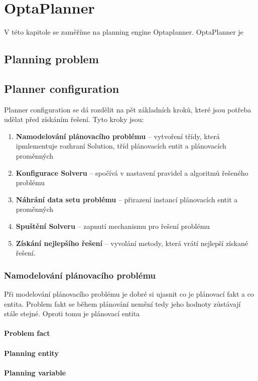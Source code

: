 \section{OptaPlanner}

V této kapitole se zaměříme na planning engine Optaplanner. OptaPlanner je 


\subsection{Planning problem}

\subsection{Planner configuration}
Planner configuration se dá rozdělit na pět základních kroků, které jsou potřeba udělat před získáním řešení. Tyto kroky jsou:
\begin{enumerate}
\item \textbf{Namodelování plánovacího problému} -- vytvoření třídy, která ipmlementuje rozhraní Solution, tříd plánovacích entit a plánovacích proměnných
\item \textbf{Konfigurace Solveru} -- spočívá v nastavení pravidel a algoritmů řešeného problému
\item \textbf{Náhrání data setu problému} -- přirazení instancí plánovacích entit a proměnných
\item \textbf{Spuštění Solveru} -- zapnutí mechanismu pro řešení problému
\item \textbf{Získání nejlepšího řešení} -- vyvolání metody, která vrátí nejlepší získané řešení.
\end{enumerate}

\subsubsection{Namodelování plánovacího problému}
Při modelování plánovacího problému je dobré si ujasnit co je plánovací fakt a co entita. Problem fakt se během plánování nemění tedy jeho hodnoty zůstávají stále stejné. Oproti tomu je plánovací entita 
\paragraph{Problem fact}
\paragraph{Planning entity}
\paragraph{Planning variable}
